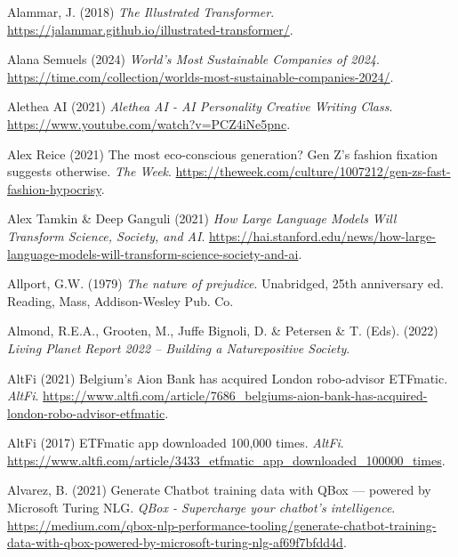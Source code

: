 \documentclass[
  letterpaper,
  DIV=11,
  numbers=noendperiod]{scrartcl}
\newlength{\cslhangindent}
\newenvironment{CSLReferences}[2] %
 {\begin{list}{}{%
  \setlength{\itemindent}{0pt}
  \setlength{\leftmargin}{0pt}
  \setlength{\parsep}{0pt}
  \ifodd #1
   \setlength{\leftmargin}{\cslhangindent}
   \setlength{\itemindent}{-1\cslhangindent}
  \fi
  \setlength{\itemsep}{#2\baselineskip}}}
 {\end{list}}
\begin{document}
\begin{CSLReferences}{0}{1}
Alammar, J. (2018) \emph{The {Illustrated Transformer}}.
\url{https://jalammar.github.io/illustrated-transformer/}.

Alana Semuels (2024) \emph{World's {Most Sustainable Companies} of
2024}.
\url{https://time.com/collection/worlds-most-sustainable-companies-2024/}.

Alethea AI (2021) \emph{Alethea {AI} - {AI Personality Creative Writing
Class}}. \url{https://www.youtube.com/watch?v=PCZ4iNe5pnc}.

Alex Reice (2021) The most eco-conscious generation? {Gen Z}'s fashion
fixation suggests otherwise. \emph{The Week}.
\url{https://theweek.com/culture/1007212/gen-zs-fast-fashion-hypocrisy}.

Alex Tamkin \& Deep Ganguli (2021) \emph{How {Large Language Models Will
Transform Science}, {Society}, and {AI}}.
\url{https://hai.stanford.edu/news/how-large-language-models-will-transform-science-society-and-ai}.

Allport, G.W. (1979) \emph{The nature of prejudice}. Unabridged, 25th
anniversary ed. Reading, Mass, Addison-Wesley Pub. Co.

Almond, R.E.A., Grooten, M., Juffe Bignoli, D. \& Petersen \& T. (Eds).
(2022) \emph{Living {Planet Report} 2022 -- {Building} a {Naturepositive
Society}}.

AltFi (2021) Belgium's {Aion Bank} has acquired {London} robo-advisor
{ETFmatic}. \emph{AltFi}.
\url{https://www.altfi.com/article/7686_belgiums-aion-bank-has-acquired-london-robo-advisor-etfmatic}.

AltFi (2017) {ETFmatic} app downloaded 100,000 times. \emph{AltFi}.
\url{https://www.altfi.com/article/3433_etfmatic_app_downloaded_100000_times}.

Alvarez, B. (2021) Generate {Chatbot} training data with {QBox} ---
powered by {Microsoft Turing NLG}. \emph{QBox - Supercharge your
chatbot's intelligence}.
\url{https://medium.com/qbox-nlp-performance-tooling/generate-chatbot-training-data-with-qbox-powered-by-microsoft-turing-nlg-af69f7bfdd4d}.


\end{CSLReferences}
\end{document}
